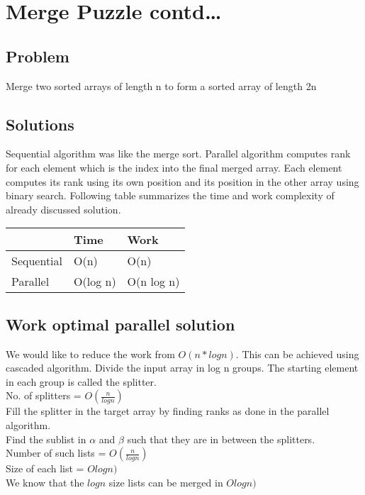 \documentclass[twoside]{article}
\begin{document}
\section{Merge Puzzle contd\ldots}
\subsection{Problem}
Merge two sorted arrays of length n to form a sorted array of length 2n

\subsection{Solutions}
Sequential algorithm was like the merge sort.
Parallel algorithm computes rank for each element which is the index into the final merged array. Each element computes its rank using its own position and its position in the other array using binary search.
Following table summarizes the time and work complexity of already discussed solution.
\begin{table}[h]
\centering
\label{my-label}
\begin{tabular}{|l|l|l|}
\hline
           & Time     & Work       \\ \hline
Sequential & O(n)     & O(n)       \\ \hline
Parallel   & O(log n) & O(n log n) \\ \hline
\end{tabular}
\end{table}
\subsection{Work optimal parallel solution}
We would like to reduce the work from \(O(n*logn)\). This can be achieved using cascaded algorithm. Divide the input array in log n groups. The starting element in each group is called the splitter. \\
No. of splitters = \( O\left(\frac{n}{log n}\right)\)\\
Fill the splitter in the target array by finding ranks as done in the parallel algorithm.\\
Find the sublist in $\alpha$ and $\beta$ such that they are in between the splitters.\\
Number of such lists = \( O\left(\frac{n}{log n}\right)\)\\
Size of each list = \(Olog n)\)\\
We know that the \(log n\) size lists can be merged in \(Olog n)\)\\ 
\end{document}
